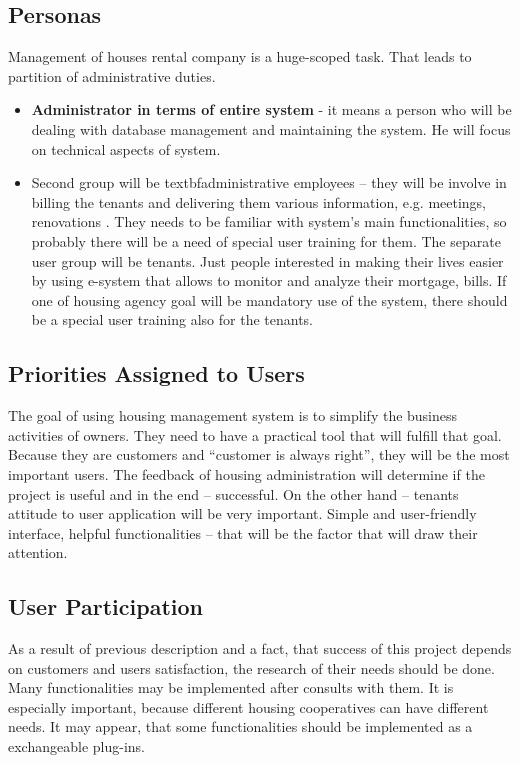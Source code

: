 \documentclass[a4paper,10pt]{report}
\begin{document}
\subsection{Personas}

Management of houses rental company is a huge-scoped task.  That leads to partition of administrative duties. 
\begin{itemize}
\item \textbf{Administrator in terms of entire system} - it means a person who will be dealing with database management and maintaining the system. He will focus on technical aspects of system.
\item Second group will be textbf{administrative employees} – they will be involve in billing the tenants and delivering them various information, e.g. meetings, renovations . They needs to be familiar with system’s main functionalities, so probably there will be a need of special user training for them.
The separate user group will be tenants. Just people interested in making their lives easier by using e-system that allows to monitor and analyze their mortgage, bills. If one of housing agency goal will be mandatory use of the system, there should be a special user training also for the tenants.
\end{itemize}


\subsection{Priorities Assigned to Users}

The goal of using housing management system is to simplify the business activities of owners. They need to have a practical tool that will fulfill that goal. Because they are customers and “customer is always right”, they will be the most important users. The feedback of housing administration will determine if the project is useful and in the end – successful.
On the other hand – tenants attitude to user application will be very important. Simple and user-friendly interface, helpful functionalities – that will be the factor that will draw their attention.


\subsection{User Participation}

As a result of previous description and a fact, that success of this project depends on customers and users satisfaction, the research of their needs should be done. Many functionalities may be implemented after consults with them.
It is especially important, because different housing cooperatives can have different needs. It may appear, that some functionalities should be implemented as a exchangeable plug-ins.
\end{document}
